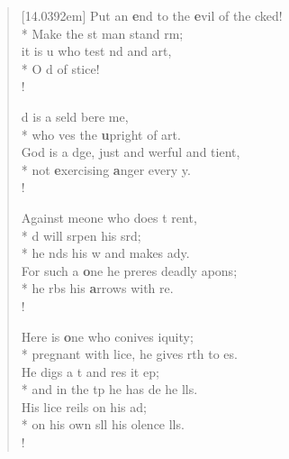 \begin{flushleft}
\begin{verse}[14.0392em]
 Put an \textbf{e}nd to the \textbf{e}vil of the cked!\\*
Make the st man stand rm;\\
it is u who test nd and art,\\*
O d of stice!\\!

 d is a seld bere me,\\*
who ves the \textbf{u}pright of art.\\
 God is a dge, just and werful and tient,\\*
not \textbf{e}xercising \textbf{a}nger every y.\\!

 Against meone who does t rent,\flagflex{\dag}\\*
d will srpen his srd;\\*
he nds his w and makes ady.\\
 For such a \textbf{o}ne he preres deadly apons;\\*
he rbs his \textbf{a}rrows with re.\\!

 Here is \textbf{o}ne who conives iquity;\\*
pregnant with lice, he gives rth to es.\\
 He digs a t and res it ep;\\*
and in the tp he has de he lls.\\
 His lice reils on his ad;\\*
on his own sll his olence lls.\\!


\end{verse}
\end{flushleft}
